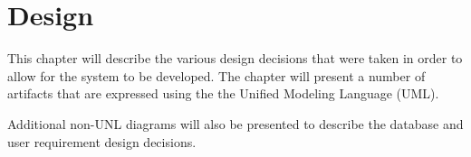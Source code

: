 \chapter{Design}
\label{cha:design}

This chapter will describe the various design decisions that were taken in order
to allow for the system to be developed. The chapter will present a number of 
artifacts that are expressed using the the Unified Modeling Language (UML).

Additional non-UNL diagrams will also be presented to describe the database and 
user requirement design decisions.


\newpage


\newpage


\newpage


\newpage


\newpage


\newpage


\newpage

